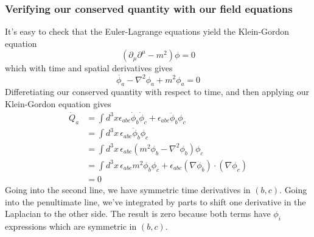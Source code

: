 \subsubsection*{Verifying our conserved quantity with our field equations} 
It's easy to check that the Euler-Lagrange equations yield the Klein-Gordon equation \[(\partial_\mu \partial^\mu  - m^2 ) \phi = 0 \] which with time and spatial derivatives gives 
\[ \ddot{ \phi_a}  - \nabla^2 \phi_a  + m^2 \phi_a  = 0 \] 
Differetiating our conserved quantity with respect to time, and then applying our Klein-Gordon equation gives 
\begin{align*} 
\dot{Q }_a & = \int d^3 x \epsilon_{ abc } \dot{ \phi}_b \dot{ \phi}_c + \epsilon_{ abc} \ddot{ \phi }_b \phi_c   \\ 
& = \int d^3 x \, \epsilon_{ abc} \ddot{ \phi}_b \phi_c \\
&= \int d^3x  \, \epsilon_{ abc} ( m^2 \phi_b   - \nabla^2 \phi_b ) \phi_c \\
&= \int d^3 x \, \epsilon_{abc} m^2 \phi_b \phi_c + \epsilon_{abc} ( \nabla \phi_b) \cdot ( \nabla \phi_c ) \\
&= 0 
\end{align*} 
Going into the second line, we have symmetric time derivatives in $( b, c)$. Going into the penultimate line, we've integrated by parts to shift one derivative in the Laplacian to the other side. The result is zero because both terms have $\phi_i $ expressions which are symmetric in $( b, c) $. 

\pagebreak 
